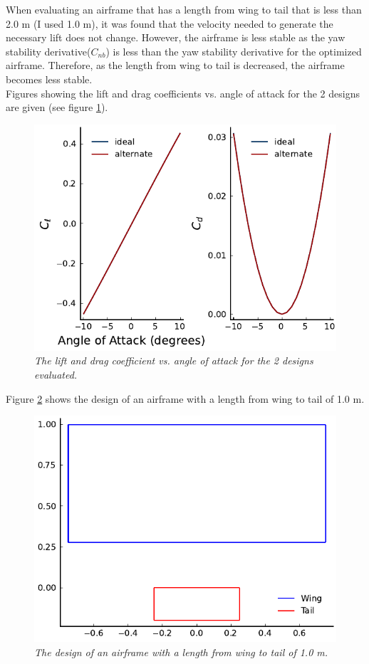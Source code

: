 \documentclass{journal}
\begin{document}
	When evaluating an airframe that has a length from wing to tail that is less than 2.0 m (I used 1.0 m), it was found that the velocity needed to generate the necessary lift does not change. However, the airframe is less stable as the yaw stability derivative(\(C_{nb}\)) is less than the yaw stability derivative for the optimized airframe. Therefore, as the length from wing to tail is decreased, the airframe becomes less stable.\\
	
	Figures showing the lift and drag coefficients vs. angle of attack for the 2 designs are given (see figure \ref{fig:wingtail_coeff}). 
	
	\begin{figure}[H]
		\includegraphics{../graphics/wingtail_coeff.pdf}
		\caption{\emph{The lift and drag coefficient vs. angle of attack for the 2 designs evaluated.}}
		\label{fig:wingtail_coeff}
	\end{figure}
	
	Figure \ref{fig:length_design} shows the design of an airframe with a length from wing to tail of 1.0 m.
	
	\begin{figure}[H]
		\includegraphics{../graphics/length_design.pdf}
		\caption{\emph{The design of an airframe with a length from wing to tail of 1.0 m.}}
		\label{fig:length_design}
	\end{figure}
	
\end{document}

